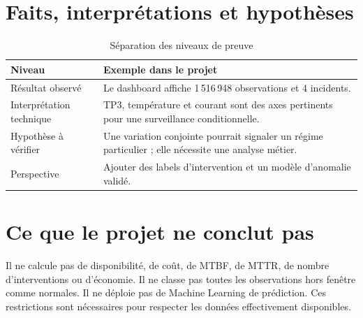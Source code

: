 \section{Faits, interprétations et hypothèses}
\begin{table}[H]
\centering
\caption{Séparation des niveaux de preuve}
\label{tab:discussion}
\begin{tabularx}{\textwidth}{p{3.4cm}X}
\toprule
\textbf{Niveau} & \textbf{Exemple dans le projet}\\
\midrule
Résultat observé & Le dashboard affiche 1\,516\,948 observations et 4 incidents.\\
Interprétation technique & TP3, température et courant sont des axes pertinents pour une surveillance conditionnelle.\\
Hypothèse à vérifier & Une variation conjointe pourrait signaler un régime particulier ; elle nécessite une analyse métier.\\
Perspective & Ajouter des labels d'intervention et un modèle d'anomalie validé.\\
\bottomrule
\end{tabularx}
\end{table}

\section{Ce que le projet ne conclut pas}
Il ne calcule pas de disponibilité, de coût, de MTBF, de MTTR, de nombre d'interventions ou d'économie. Il ne classe pas toutes les observations hors fenêtre comme normales. Il ne déploie pas de Machine Learning de prédiction. Ces restrictions sont nécessaires pour respecter les données effectivement disponibles.
